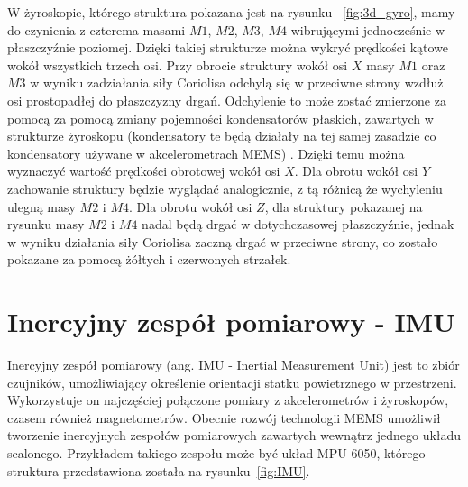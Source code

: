 W żyroskopie, którego struktura pokazana jest na rysunku ~\ref{fig:3d_gyro}, mamy do czynienia z czterema masami $M1$, $M2$, $M3$, $M4$ wibrującymi jednocześnie w płaszczyźnie poziomej. Dzięki takiej strukturze można wykryć prędkości kątowe wokół wszystkich trzech osi. Przy obrocie struktury wokół osi $X$ masy $M1$ oraz $M3$ w wyniku zadziałania siły Coriolisa odchylą się w przeciwne strony wzdłuż osi prostopadłej do płaszczyzny drgań. Odchylenie to może zostać zmierzone za pomocą za pomocą zmiany pojemności kondensatorów płaskich, zawartych w strukturze żyroskopu (kondensatory te będą działały na tej samej zasadzie co kondensatory używane w akcelerometrach MEMS) . Dzięki temu można wyznaczyć wartość prędkości obrotowej wokół osi $X$. Dla obrotu wokół osi $Y$ zachowanie struktury będzie wyglądać analogicznie, z tą różnicą że wychyleniu ulegną masy $M2$ i $M4$. Dla obrotu wokół osi $Z$, dla struktury pokazanej na rysunku masy $M2$ i $M4$ nadal będą drgać w dotychczasowej płaszczyźnie, jednak w wyniku działania siły Coriolisa zaczną drgać w przeciwne strony, co zostało pokazane za pomocą żółtych i czerwonych strzałek.



\section{Inercyjny zespół pomiarowy - IMU}

Inercyjny zespół pomiarowy (ang. IMU - Inertial Measurement Unit) jest to zbiór czujników, umożliwiający określenie orientacji statku powietrznego w przestrzeni. Wykorzystuje on najczęściej połączone pomiary z akcelerometrów i żyroskopów, czasem również magnetometrów. Obecnie rozwój technologii MEMS umożliwił tworzenie inercyjnych zespołów pomiarowych zawartych wewnątrz jednego układu scalonego. Przykładem takiego zespołu może być układ MPU-6050, którego struktura przedstawiona została na rysunku~\ref{fig:IMU}.

